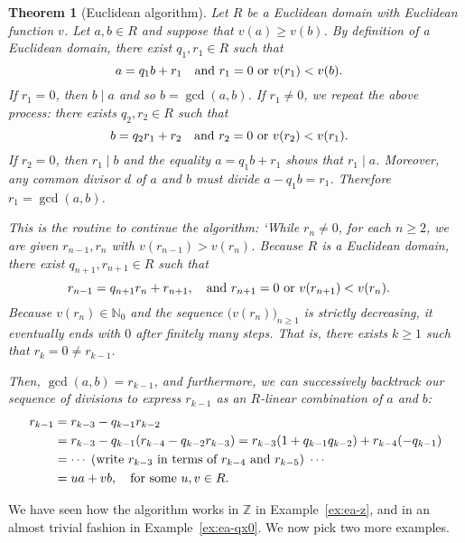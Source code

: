 \documentclass[12pt]{article}
\newcommand{\qbox}[1]{\quad\hbox{#1}\quad}
\newtheorem{thm}{Theorem}[section]
\theoremstyle{definition}
\newcounter{ex}\renewcommand\theex{\arabic{ex}}
\newcommand{\N}{\ensuremath{\mathbb{N}}}
\newcommand{\Z}{\ensuremath{\mathbb{Z}}}
\begin{document}
\begin{thm}[Euclidean algorithm]\label{Euclidean algorithm}
Let $R$ be a Euclidean domain with Euclidean function $v$.
Let $a,b\in R$ and suppose that $v(a)\geq v(b)$.
By definition of a Euclidean domain, there exist $q_1,r_1\in R$ such
that
$$a=q_1b+r_1\qbox{and $r_1=0$ or $v(r_1)<v(b)$.}$$
If $r_1=0$, then $b\mid a$ and so $b=\gcd(a,b)$.
If $r_1\neq0$, we repeat the above process: there exists $q_2,r_2\in R$
such that
$$b=q_2r_1+r_2\qbox{and $r_2=0$ or $v(r_2)<v(r_1)$.}$$
If $r_2=0$, then $r_1\mid b$ and the equality $a=q_1b+r_1$ shows that
$r_1\mid a$. Moreover, any common divisor $d$ of $a$ and $b$ must
divide $a-q_1b=r_1$. Therefore $r_1=\gcd(a,b)$.

This is the routine to continue the algorithm:
`While $r_n\neq0$, for each $n\geq2$, we are given $r_{n-1},r_n$ with
$v(r_{n-1})>v(r_n)$. Because $R$ is a Euclidean domain, there exist
$q_{n+1},r_{n+1}\in R$ such that
$$r_{n-1}=q_{n+1}r_n+r_{n+1},\qbox{and $r_{n+1}=0$ or $v(r_{n+1})<v(r_n)$.}$$
Because $v(r_n)\in\N_0$ and the sequence $\big(v(r_n)\big)_{n\geq1}$
is strictly decreasing, it eventually ends with $0$ after finitely
many steps. That is, there exists
$k\geq1$ such that $r_k=0\neq r_{k-1}$.

Then, $\gcd(a,b)=r_{k-1}$, and furthermore, we can successively
backtrack our sequence of divisions to express $r_{k-1}$ as an
$R$-linear combination of $a$ and $b$:
\begin{align*}
r_{k-1}&=r_{k-3}-q_{k-1}r_{k-2}\\
&=r_{k-3}-q_{k-1}(r_{k-4}-q_{k-2}r_{k-3})=r_{k-3}(1+q_{k-1}q_{k-2})+r_{k-4}(-q_{k-1})\\
&=\cdots\;\hbox{(write $r_{k-3}$ in terms of $r_{k-4}$ and $r_{k-5}$)}\;\cdots \\
&=ua+vb,\qbox{for some $u,v\in R$.}
\end{align*}
\end{thm}

We have seen how the algorithm works in $\Z$ in
Example~\ref{ex:ea-z}, and in an almost trivial fashion in
Example~\ref{ex:ea-qx0}. We now pick two more examples. 
\end{document}
